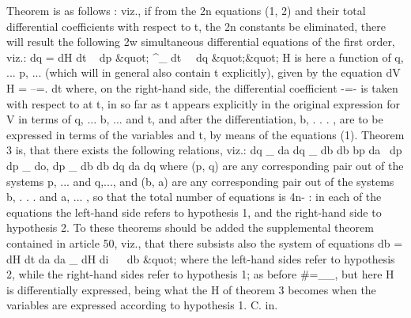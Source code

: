\documentclass[11pt,a4paper]{book}
\begin{document}
Theorem
is
as
follows
:
viz.,
if
from
the
2n
equations
(1,
2)
and
their
total
differential
coefficients with
respect
to
t,
the 2n
constants be
eliminated, there
will result
the
following 2w simultaneous
differential equations of the
first
order,
viz.:
dq =
dH
dt
~
dp
\&quot;
^_
dt~
~dq
\&quot;\&quot;
H
is
here
a
function
of
q, ...
p,
... (which
will
in
general
also
contain
t
explicitly),
given by the equation
dV
H = --=.
dt
where, on
the
right-hand
side,
the
differential
coefficient
-=-
is
taken
with
respect
to
at
t,
in
so
far
as
t
appears
explicitly
in
the
original
expression
for V
in
terms
of
q,
...
b,
... and
t,
and
after
the
differentiation,
b,
.
.
.
,
are
to
be
expressed
in
terms
of
the
variables and
t, by means of the equations
(1).
Theorem 3
is,
that there
exists the following
relations,
viz.:
dq _
da
dq _
db
db
bp
da~
dp
dp _
do,
dp _
db
db
dq
da
dq
where
(p,
q)
are
any
corresponding
pair out
of
the
systems p, ... and
q,..., and
(b,
a)
are
any
corresponding
pair
out
of
the
systems
b,
.
.
.
and
a,
...
,
so
that
the
total
number
of
equations
is
4n-
:
in
each
of
the
equations
the
left-hand
side
refers
to
hypothesis
1, and the right-hand
side
to hypothesis
2.
To
these
theorems
should
be
added
the
supplemental
theorem
contained
in
article
50,
viz., that there
subsists
also
the system
of equations
db =
dH
dt
da
da _
dH
di~
~
db
\&quot;
where
the
left-hand
sides
refer
to
hypothesis
2,
while
the
right-hand
sides
refer
to
hypothesis
1;
as
before \#=__,
but
here H
is
differentially
expressed,
being
what
the H of theorem 3 becomes when
the
variables are expressed according
to hypothesis
1.
C.
in.

\end{document}
